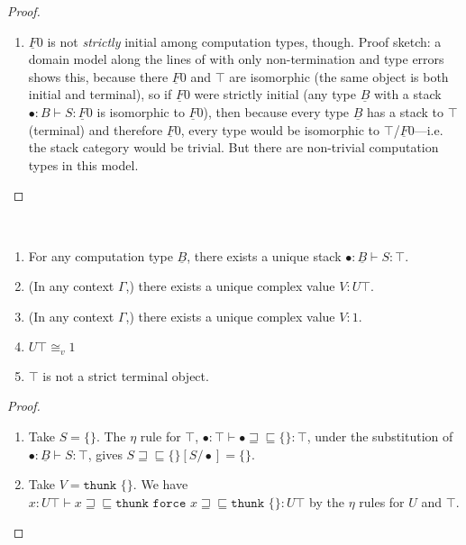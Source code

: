\documentclass[acmsmall,screen,12pt]{acmart}
\renewcommand{\u}{\underline}
\newcommand{\ltdyn}{\sqsubseteq}
\newcommand{\gtdyn}{\sqsupseteq}
\newcommand{\equidyn}{\mathrel{\gtdyn\ltdyn}}
\newcommand{\bindXtoYinZ}[2]{\kw{bind}#2 \leftarrow #1;}
\newcommand{\kw}[1]{\texttt{#1}\,\,}
\newcommand{\thunk}{\kw{thunk}}
\newcommand{\force}{\kw{force}}
\newcommand{\abort}{\kw {abort}}
\begin{document}
\begin{longonly}
\begin{proof}
\begin{enumerate}
\item $\u F 0$ is not \emph{strictly} initial among computation types,
  though.  Proof sketch: a domain model along the lines of
  \citep{newlicata2018-fscd} with only non-termination and type errors shows this,
  because there $\u F 0$ and $\top$ are isomorphic (the same object is
  both initial and terminal), so if $\u F 0$ were strictly initial (any
  type $\u B$ with a stack $\bullet : B \vdash S : \u F 0$ is isomorphic
  to $\u F 0$), then because every type $\u B$ has a stack to $\top$
  (terminal) and therefore $\u F 0$, every type would be isomorphic to
  $\top$/$\u F 0$---i.e. the stack category would be trivial.  But there
  are non-trivial computation types in this model.  
    \end{enumerate}
\end{proof}
  
  \begin{lemma} ~ \label{lem:terminal}
    \begin{enumerate}
    \item For any computation type $\u B$, there exists a unique stack
      $\bullet : \u B \vdash S : \top$.
    \item (In any context $\Gamma$,) there exists a unique complex value
      $V : U \top$.
    \item (In any context $\Gamma$,) there exists a unique complex value
      $V : 1$.
    \item $U \top \cong_v 1$
    \item $\top$ is not a strict terminal object.  
    \end{enumerate}
  \end{lemma}
  \begin{proof} ~
    \begin{enumerate}
    \item Take $S = \{\}$.  The $\eta$ rule for $\top$, $\bullet : \top
      \vdash \bullet \equidyn \{\} : \top$, under the substitution of
      $\bullet : \u B \vdash S : \top$, gives $S \equidyn
      \{\}[S/\bullet] = \{\}$.  

    \item Take $V = \thunk{\{\}}$.  We have $x : U \top \vdash x
      \equidyn \thunk{\force{x}} \equidyn \thunk{\{\}} : U \top$ by the
      $\eta$ rules for $U$ and $\top$.


\end{enumerate}
\end{proof}
\end{longonly}
\end{document}
